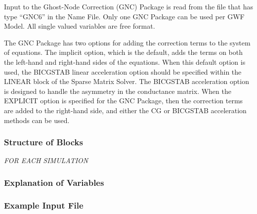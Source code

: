 Input to the Ghost-Node Correction (GNC) Package is read from the file that has type ``GNC6'' in the Name File.  Only one GNC Package can be used per GWF Model.  All single valued variables are free format.  

The GNC Package has two options for adding the correction terms to the system of equations.  The implicit option, which is the default, adds the terms on both the left-hand and right-hand sides of the equations.  When this default option is used, the BICGSTAB linear acceleration option should be specified within the LINEAR block of the Sparse Matrix Solver.  The BICGSTAB acceleration option is designed to handle the asymmetry in the conductance matrix.  When the EXPLICIT option is specified for the GNC Package, then the correction terms are added to the right-hand side, and either the CG or BICGSTAB acceleration methods can be used.

\vspace{5mm}
\subsubsection{Structure of Blocks}
\vspace{5mm}

\noindent \textit{FOR EACH SIMULATION}




\vspace{5mm}
\subsubsection{Explanation of Variables}
\begin{description}

\end{description}

\vspace{5mm}
\subsubsection{Example Input File}


